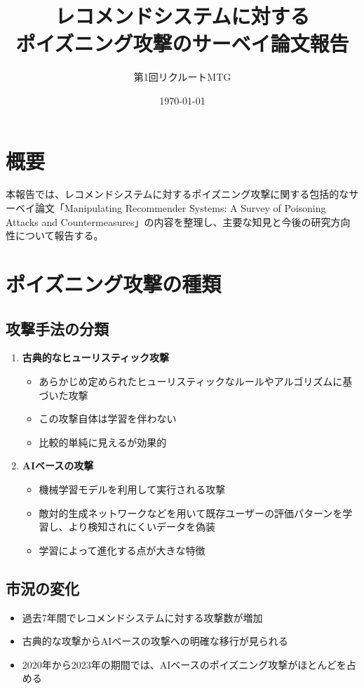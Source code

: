 \documentclass[11pt,a4paper]{article}
\title{レコメンドシステムに対する \\ ポイズニング攻撃のサーベイ論文報告}
\author{第1回リクルートMTG}
\date{\today}
\begin{document}
\maketitle

\section{概要}
本報告では、レコメンドシステムに対するポイズニング攻撃に関する包括的なサーベイ論文「Manipulating Recommender Systems: A Survey of Poisoning Attacks and Countermeasures」の内容を整理し、主要な知見と今後の研究方向性について報告する。

\section{ポイズニング攻撃の種類}

\subsection{攻撃手法の分類}
\begin{enumerate}
    \item \textbf{古典的なヒューリスティック攻撃}
    \begin{itemize}
        \item あらかじめ定められたヒューリスティックなルールやアルゴリズムに基づいた攻撃
        \item この攻撃自体は学習を伴わない
        \item 比較的単純に見えるが効果的
    \end{itemize}
    
    \item \textbf{AIベースの攻撃}
    \begin{itemize}
        \item 機械学習モデルを利用して実行される攻撃
        \item 敵対的生成ネットワークなどを用いて既存ユーザーの評価パターンを学習し、より検知されにくいデータを偽装
        \item 学習によって進化する点が大きな特徴
    \end{itemize}
\end{enumerate}

\subsection{市況の変化}
\begin{itemize}
    \item 過去7年間でレコメンドシステムに対する攻撃数が増加
    \item 古典的な攻撃からAIベースの攻撃への明確な移行が見られる
    \item 2020年から2023年の期間では、AIベースのポイズニング攻撃がほとんどを占める
\end{itemize}
\end{document}
